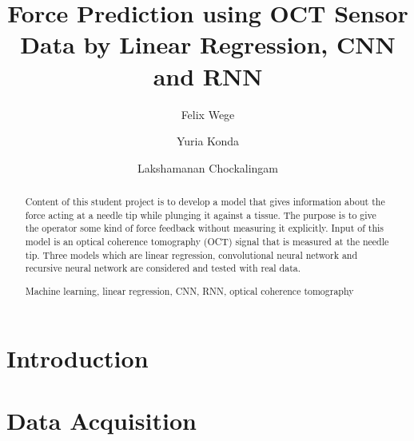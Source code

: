 \documentclass[runningheads,a4paper]{llncs}
\newcommand{\keywords}[1]{\par\addvspace\baselineskip
\noindent\keywordname\enspace\ignorespaces#1}
\begin{document}
\mainmatter  %

\title{Force Prediction using OCT Sensor Data 
by Linear Regression, CNN and RNN}

\author{Felix Wege \and Yuria Konda \and Lakshamanan Chockalingam}



\maketitle


\begin{abstract}
Content of this student project is to develop a model that gives 
information about the force acting at a needle tip while plunging it against 
a tissue.
The purpose is to give the operator some kind of force feedback
without measuring it explicitly.
Input of this model is an optical coherence tomography (OCT) signal
that is measured at the needle tip.
Three models which are linear regression, convolutional neural network
and recursive neural network are considered and tested with real data.

\keywords{Machine learning, linear regression, CNN, RNN, optical coherence tomography}
\end{abstract}

\section{Introduction}\label{sec:intro}


\section{Data Acquisition}\label{sec:dataAcqui}

\end{document}
